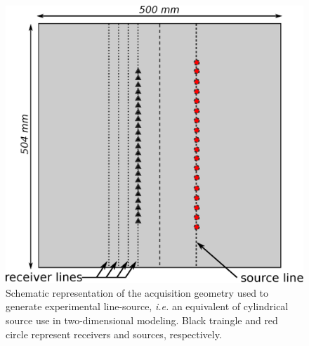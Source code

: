 \documentclass[manuscript,revised]{geophysics}
\begin{document}
\begin{figure}[!h]
	\centering
	\includegraphics[scale=0.5]{fig/amplitude_acqui_principle.eps}
	\caption{Schematic representation of the acquisition geometry used to generate experimental line-source, \textit{i.e.} an equivalent of cylindrical source use in two-dimensional modeling. Black traingle and red circle represent receivers and sources, respectively.}
	\label{amplitude_acqui_principle}
\end{figure}
\end{document}
